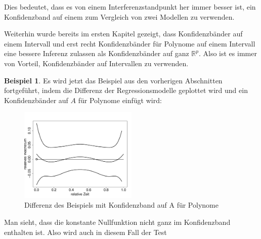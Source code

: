 \documentclass[12pt,a4paper]{article}
\theoremstyle{definition}
\newtheorem{Beispiel}[Definition]{Beispiel}
\theoremstyle{definition}
\theoremstyle{definition}
\theoremstyle{definition}
\begin{document}
Dies bedeutet, dass es von einem Interferenzstandpunkt her immer besser ist, ein Konfidenzband auf einem  zum Vergleich von zwei Modellen zu verwenden.

Weiterhin wurde bereits im ersten Kapitel gezeigt, dass Konfidenzbänder auf einem Intervall und erst recht Konfidenzbänder für Polynome auf einem Intervall eine bessere Inferenz zulassen als Konfidenzbänder auf ganz $\mathbb{R}^{p}$. Also ist es immer von Vorteil, Konfidenzbänder auf Intervallen zu verwenden.


\begin{Beispiel}
Es wird jetzt das Beispiel aus den vorherigen Abschnitten fortgeführt, indem die Differenz der Regressionsmodelle geplottet wird und ein Konfidenzbänder auf $A$ für Polynome einfügt wird:

\begin{figure}[H] 
  \centering
     \includegraphics[width=0.5\textwidth]{Bsp-KB-poly-hetero}
  \caption{Differenz des Beispiels mit Konfidenzband auf A für Polynome}
  \label{KB-poly-hetero-BSP}
\end{figure}

Man sieht, dass die konstante Nullfunktion nicht ganz im Konfidenzband enthalten ist. Also wird auch in diesem Fall der Test 

\end{Beispiel}


%
%
\end{document}
